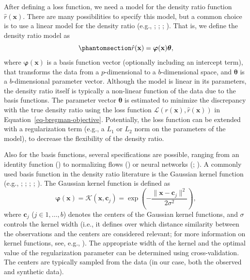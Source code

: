 \documentclass[
]{article}
\newcommand{\bx}{\mathbf{x}}
\begin{document}
After defining a loss function, we need a model for the density ratio
function \(\hat{r}(\bx)\). There are many possibilities to specify this
model, but a common choice is to use a linear model for the density
ratio (e.g., ;
;
;
). That is, we
define the density ratio model as
\begin{equation}\phantomsection\label{eq-dr-model}{
\hat{r}(\bx) = \boldsymbol{\varphi}(\bx) \boldsymbol{\theta},
}\end{equation} where \(\boldsymbol{\varphi}(\bx)\) is a basis function
vector (optionally including an intercept term), that transforms the
data from a \(p\)-dimensional to a \(b\)-dimensional space, and
\(\boldsymbol{\theta}\) is a \(b\)-dimensional parameter vector.
Although the model is linear in its parameters, the density ratio itself
is typically a non-linear function of the data due to the basis
functions. The parameter vector \(\boldsymbol{\theta}\) is estimated to
minimize the discrepancy with the true density ratio using the loss
function \(\mathcal{L}(r(\bx), \hat{r}(\bx))\) in
Equation~\ref{eq-bregman-objective}. Potentially, the loss function can
be extended with a regularization term (e.g., a \(L_1\) or \(L_2\) norm
on the parameters of the model), to decrease the flexibility of the
density ratio.

Also for the basis functions, several specifications are possible,
ranging from an identity function
() to normalizing flows
() or
neural networks (;
). A commonly
used basis function in the density ratio literature is the Gaussian
kernel function (e.g., ;
;
;
;
). The Gaussian
kernel function is defined as \[
\boldsymbol{\varphi}(\bx) = \mathcal{K}(\bx, \boldsymbol{c}_j) = 
\exp\left(
- \frac{\lVert\bx - \boldsymbol{c}_j \rVert^2}{2 \sigma^2}
\right),
\] where \(\boldsymbol{c}_j\) (\(j \in 1, \dots, b\)) denotes the
centers of the Gaussian kernel functions, and \(\sigma\) controls the
kernel width (i.e., it defines over which distance similarity between
the observations and the centers are considered relevant; for more
information on kernel functions, see, e.g.,
). The appropriate width
of the kernel and the optimal value of the regularization parameter can
be determined using cross-validation. The centers are typically sampled
from the data (in our case, both the observed and synthetic data).
\end{document}
